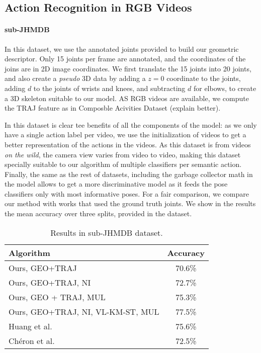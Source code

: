  
\subsection{Action Recognition in RGB Videos}

 \paragraph{sub-JHMDB} In this dataset, we use the annotated joints provided to build our geometric descriptor. Only 15 joints per frame are annotated, and the coordinates of the joins are in 2D image coordinates. We first translate the 15 joints into 20 joints, and also create a \emph{pseudo} 3D data by adding a $z=0$ coordinate to the joints, adding $d$ to the joints of wrists and knees, and subtracting $d$ for elbows, to create a 3D skeleton suitable to our model. AS RGB videos are available, we compute the TRAJ feature as in Composble Acivities Dataset (explain better).

In this dataset is clear tee benefits of all the components of the model: as we only have a single action label per video, we use the initialization of videos to get a better representation of the actions in the videos. As this dataset is from videos \emph{on the wild}, the camera view varies from video to video, making this dataset specially suitable to our algorithm of multiple classifiers per semantic action. Finally, the same as the rest of datasets, including the garbage collector math in the model allows to get a more discriminative model as it feeds the pose classifiers only with most informative poses. For a fair comparison, we compare our method with works that used the ground truth joints. We show in the results the mean accuracy over three splits, provided in the dataset.

\begin{table}
\centering
\begin{tabular}{|l|c|}
\hline
\textbf{Algorithm} & \textbf{Accuracy}\\
\hline
Ours, GEO+TRAJ & 70.6\%\\
Ours, GEO+TRAJ, NI & 72.7\% \\
Ours, GEO + TRAJ, MUL & 75.3\%\\
Ours, GEO+TRAJ, NI, VL-KM-ST, MUL &  77.5\% \\
\hline
Huang et al. \cite{Jhuang2013} & 75.6\% \\
Ch\'eron et al. \cite{Cheron2015} & 72.5\%\\
\hline
\end{tabular}
\caption{Results in sub-JHMDB dataset. }
\end{table}


